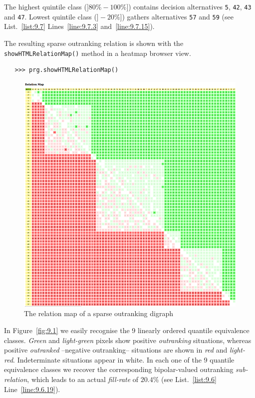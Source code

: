 The highest quintile class ($]80\%-100\%]$) contains decision alternatives \texttt{5}, \texttt{42}, \texttt{43} and \texttt{47}. Lowest quintile class ($]-20\%]$) gathers alternatives \texttt{57} and \texttt{59} (see List.~\vref{list:9.7} Lines~\ref{line:9.7.3} and~\ref{line:9.7.15}).

The resulting sparse outranking relation is shown with the \texttt{showHTMLRela\-tionMap()} method in a heatmap browser view.
\begin{lstlisting}
   >>> prg.showHTMLRelationMap()
\end{lstlisting}
\begin{figure}[ht]
\includegraphics[width=\hsize]{Figures/9-1-sparse75RelationMap.png}
\caption{The relation map of a sparse outranking digraph}
\label{fig:9.1}       %
\end{figure}

In Figure~\vref{fig:9.1} we easily recognise the 9 linearly ordered quantile equivalence classes. \emph{Green} and \emph{light-green} pixels show positive \emph{outranking} situations, whereas positive \emph{outranked} --negative outranking-- situations are shown in \emph{red} and \emph{light-red}. Indeterminate situations appear in white. In each one of the 9 quantile equivalence classes we recover the corresponding bipolar-valued outranking \emph{sub-relation}, which leads to an actual \emph{fill-rate} of $20.4\%$ (see List.~\vref{list:9.6} Line~\ref{line:9.6.19}).

